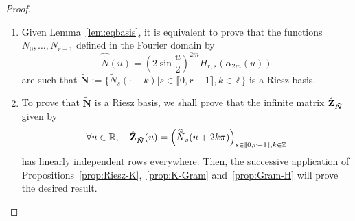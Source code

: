 \begin{proof}
  \begin{enumerate}
    \item Given Lemma~\ref{lem:eqbasis}, it is equivalent to prove that the functions $\tilde{N}_0, \ldots, 
      \tilde{N}_{r-1}$ defined in the Fourier domain by
      \begin{equation*}
	\widehat{\tilde{N}}(u) = {\left(2\sin \frac{u}{2}\right)}^{2m} H_{r,s}(\alpha_{2m}(u))
      \end{equation*}
    are such that $\bm{\tilde{N}} := \{\tilde{N}_s(\cdot-k) | s \in \llbracket0, r-1\rrbracket, k \in \mathbb{Z}\}$ is a 
    Riesz basis.
    \item To prove that $\bm{\tilde{N}}$ is a Riesz basis, we shall prove that the infinite matrix 
      $\hat{\mathbf{Z}}_{\bm{\tilde{N}}}$ given by
      \begin{equation*}
	\forall u \in \mathbb{R}, \quad \hat{\mathbf{Z}}_{\bm{\tilde{N}}}(u) = 
	{\left(\widehat{\tilde{N}}_s(u+2k\pi)\right)}_{s \in \llbracket0,r-1\rrbracket, k \in \mathbb{Z}}
      \end{equation*}
      has linearly independent rows everywhere. Then, the successive application of 
      Propositions~\ref{prop:Riesz-K},~\ref{prop:K-Gram} and~\ref{prop:Gram-H} will prove the desired result. 


\end{enumerate}
\end{proof}

